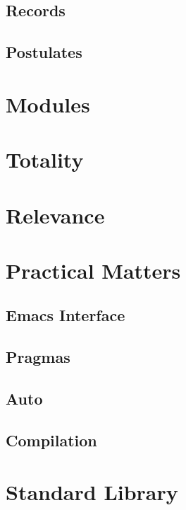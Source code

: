 \documentclass{article}
\begin{document}
\subsection{Records}
\subsection{Postulates}
\section{Modules}
\label{sec:modules}
\section{Totality}
\section{Relevance}
\section{Practical Matters}
\subsection{Emacs Interface}
\subsection{Pragmas}
\subsection{Auto}
\subsection{Compilation}
\section{Standard Library}
\end{document}
